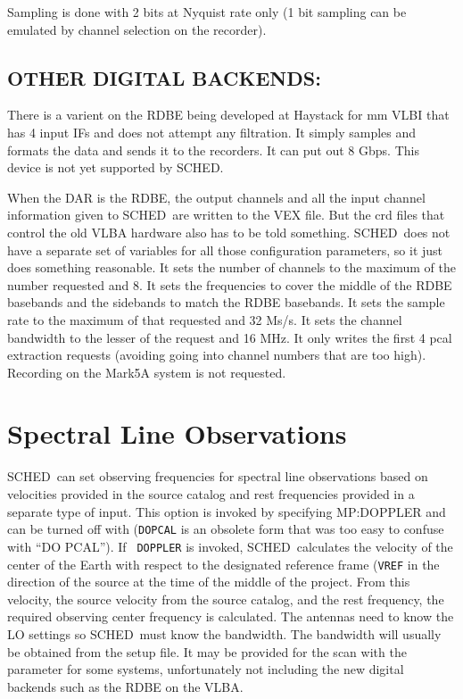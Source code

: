\documentclass{report}
\newcommand{\schedb}{{\sc SCHED~}}
\begin{document}
Sampling is done with 2 bits at Nyquist rate only (1 bit sampling can be
emulated by channel selection on the recorder).



\subsection{\label{SSEC:OTHERREC}OTHER DIGITAL BACKENDS:}

There is a varient on the RDBE being developed at Haystack for mm VLBI
that has 4 input IFs and does not attempt any filtration.  It simply
samples and formats the data and sends it to the recorders.  It can
put out 8 Gbps.  This device is not yet supported by SCHED.

When the DAR is the RDBE, the output channels and all the input
channel information given to \schedb are written to the VEX file.  But
the crd files that control the old VLBA hardware also has to be told
something. \schedb does not have a separate set of variables for all
those configuration parameters, so it just does something reasonable.
It sets the number of channels to the maximum of the number requested
and 8.  It sets the frequencies to cover the middle of the RDBE
basebands and the sidebands to match the RDBE basebands.  It sets the
sample rate to the maximum of that requested and 32 Ms/s.  It sets the
channel bandwidth to the lesser of the request and 16 MHz.  It only
writes the first 4 pcal extraction requests (avoiding going into
channel numbers that are too high).  Recording on the Mark5A system
is not requested.


\section{\label{SEC:LINE}Spectral Line Observations}

\schedb can set observing frequencies for spectral line observations
based on velocities provided in the source catalog and rest
frequencies provided in a separate type of input. This option is
invoked by specifying  {MP:DOPPLER} and can be
turned off with  ({\tt DOPCAL} is an
obsolete form that was too easy to confuse with ``DO PCAL'').  If {\tt
DOPPLER} is invoked, \schedb calculates the velocity of the center of
the Earth with respect to the designated reference frame ({\tt VREF}
in the direction of the source at the time of the middle of the
project. From this velocity, the source velocity from the source
catalog, and the rest frequency, the required observing center
frequency is calculated.  The antennas need to know the LO settings so
\schedb must know the bandwidth.  The bandwidth will usually be
obtained from the setup file.  It may be provided for the scan with
the  parameter for some systems, unfortunately
not including the new digital backends such as the RDBE on the VLBA.
\end{document}
